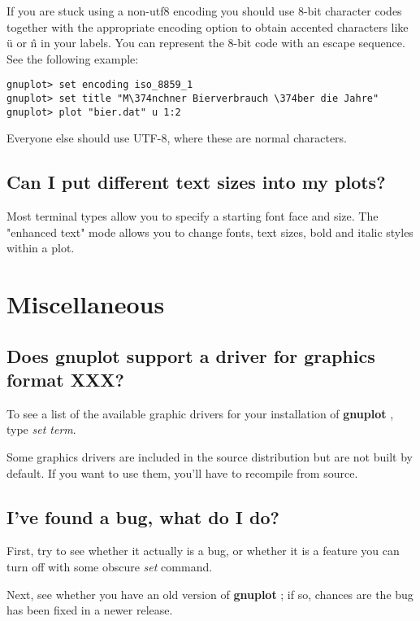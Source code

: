\documentclass[letter,11pt]{article}
\newcommand{\gnuplot}{\textbf{gnuplot }}
\begin{document}
{If you are stuck using a non-utf8 encoding you should use
8-bit character codes together with the appropriate encoding option
to obtain accented characters like \"u or \^n in your labels.
You can represent the 8-bit code with an escape sequence.
See the following example:

\small
\begin{verbatim}
gnuplot> set encoding iso_8859_1
gnuplot> set title "M\374nchner Bierverbrauch \374ber die Jahre"
gnuplot> plot "bier.dat" u 1:2
\end{verbatim}
\normalsize

Everyone else should use UTF-8, where these are normal characters.

\subsection{Can I put different text sizes into my plots?}

Most terminal types allow you to specify a starting font face and size.
The "enhanced text" mode allows you to change fonts, text sizes, bold and
italic styles within a plot.



\section{Miscellaneous}

\subsection{Does \gnuplot support a driver for graphics format XXX?}

To see a list of the available graphic drivers for your installation of
\gnuplot, type {\em set term}.

Some graphics drivers are included in the source distribution
but are not built by default. If you want to use them, you'll
have to recompile from source.

\subsection{I've found a bug, what do I do?}

First, try to see whether it actually is a bug, or whether it
is a feature you can turn off with some obscure {\em set} command.

Next, see whether you have an old version of \gnuplot; if so,
chances are the bug has been fixed in a newer release.

}
\end{document}
